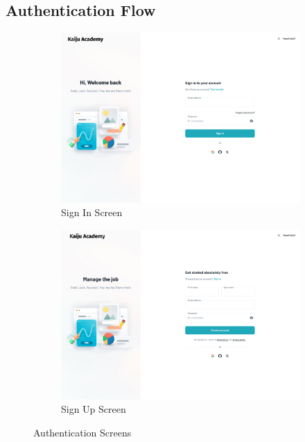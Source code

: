 \documentclass[a4paper, 11pt]{scrreprt}
\begin{document}
\subsection{Authentication Flow}
\begin{figure}[ht]
    \centering
    \begin{subfigure}[b]{0.45\textwidth}
        \centering
        \includegraphics[width=\textwidth]{UI/SignIn.jpg}
        \caption{Sign In Screen}
    \end{subfigure}
    \hfill
    \begin{subfigure}[b]{0.45\textwidth}
        \centering
        \includegraphics[width=\textwidth]{UI/SignUp.jpg}
        \caption{Sign Up Screen}
    \end{subfigure}
    \caption{Authentication Screens}
\end{figure}
\end{document}
